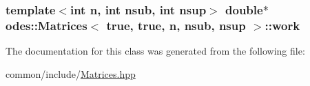 \subsubsection[{work}]{\setlength{\rightskip}{0pt plus 5cm}template$<$int n, int nsub, int nsup$>$ double$\ast$ {\bf odes\+::\+Matrices}$<$ true, true, n, nsub, nsup $>$\+::work\hspace{0.3cm}{\ttfamily [private]}}\label{classodes_1_1Matrices_3_01true_00_01true_00_01n_00_01nsub_00_01nsup_01_4_a11aeb74270d9f8b97c708ef9bf226902}


The documentation for this class was generated from the following file\+:\begin{DoxyCompactItemize}
\item 
common/include/\hyperlink{Matrices_8hpp}{Matrices.\+hpp}\end{DoxyCompactItemize}
